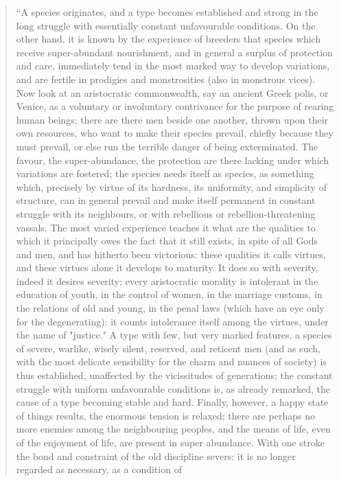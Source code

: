 \begin{quotation}
``A species originates, and a type becomes established and strong in the long struggle with
essentially constant unfavourable conditions. On the other hand, it is known by the experience of
breeders that species which receive super-abundant nourishment, and in general a surplus of
protection and care, immediately tend in the most marked way to develop variations, and are
fertile in prodigies and monstrosities (also in monstrous vices). Now look at an aristocratic
commonwealth, say an ancient Greek polis, or Venice, as a voluntary or involuntary contrivance
for the purpose of rearing human beings; there are there men beside one another, thrown upon
their own resources, who want to make their species prevail, chiefly because they must prevail,
or else run the terrible danger of being exterminated. The favour, the super-abundance, the
protection are there lacking under which variations are fostered; the species needs itself as
species, as something which, precisely by virtue of its hardness, its uniformity, and simplicity of
structure, can in general prevail and make itself permanent in constant struggle with its
neighbours, or with rebellious or rebellion-threatening vassals. The most varied experience
teaches it what are the qualities to which it principally owes the fact that it still exists, in spite of
all Gods and men, and has hitherto been victorious: these qualities it calls virtues, and these
virtues alone it develops to maturity. It does so with severity, indeed it desires severity; every
aristocratic morality is intolerant in the education of youth, in the control of women, in the
marriage customs, in the relations of old and young, in the penal laws (which have an eye only
for the degenerating): it counts intolerance itself among the virtues, under the name of "justice."
A type with few, but very marked features, a species of severe, warlike, wisely silent, reserved,
and reticent men (and as such, with the most delicate sensibility for the charm and nuances of
society) is thus established, unaffected by the vicissitudes of generations; the constant struggle
with uniform unfavourable conditions is, as already remarked, the cause of a type becoming
stable and hard. Finally, however, a happy state of things results, the enormous tension is
relaxed; there are perhaps no more enemies among the neighbouring peoples, and the means of
life, even of the enjoyment of life, are present in super abundance. With one stroke the bond and
constraint of the old discipline severs: it is no longer regarded as necessary, as a condition of

\end{quotation}
